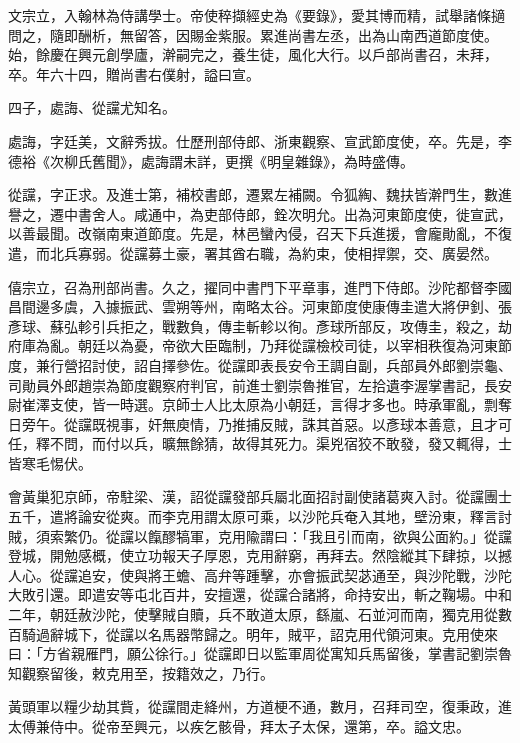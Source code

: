 \begin{pinyinscope}
 文宗立，入翰林為侍講學士。帝使稡擷經史為《要錄》，愛其博而精，試舉諸條擿問之，隨即酬析，無留答，因賜金紫服。累進尚書左丞，出為山南西道節度使。始，餘慶在興元創學廬，澣嗣完之，養生徒，風化大行。以戶部尚書召，未拜，卒。年六十四，贈尚書右僕射，謚曰宣。



 四子，處誨、從讜尤知名。



 處誨，字廷美，文辭秀拔。仕歷刑部侍郎、浙東觀察、宣武節度使，卒。先是，李德裕《次柳氏舊聞》，處誨謂未詳，更撰《明皇雜錄》，為時盛傳。



 從讜，字正求。及進士第，補校書郎，遷累左補闕。令狐綯、魏扶皆澣門生，數進譽之，遷中書舍人。咸通中，為吏部侍郎，銓次明允。出為河東節度使，徙宣武，以善最聞。改嶺南東道節度。先是，林邑蠻內侵，召天下兵進援，會龐勛亂，不復遣，而北兵寡弱。從讜募土豪，署其酋右職，為約束，使相捍禦，交、廣晏然。



 僖宗立，召為刑部尚書。久之，擢同中書門下平章事，進門下侍郎。沙陀都督李國昌間邊多虞，入據振武、雲朔等州，南略太谷。河東節度使康傳圭遣大將伊釗、張彥球、蘇弘軫引兵拒之，戰數負，傳圭斬軫以徇。彥球所部反，攻傳圭，殺之，劫府庫為亂。朝廷以為憂，帝欲大臣臨制，乃拜從讜檢校司徒，以宰相秩復為河東節度，兼行營招討使，詔自擇參佐。從讜即表長安令王調自副，兵部員外郎劉崇龜、司勛員外郎趙崇為節度觀察府判官，前進士劉崇魯推官，左拾遺李渥掌書記，長安尉崔澤支使，皆一時選。京師士人比太原為小朝廷，言得才多也。時承軍亂，剽奪日旁午。從讜既視事，奸無庾情，乃推捕反賊，誅其首惡。以彥球本善意，且才可任，釋不問，而付以兵，曠無餘猜，故得其死力。渠兇宿狡不敢發，發又輒得，士皆寒毛惕伏。



 會黃巢犯京師，帝駐梁、漢，詔從讜發部兵屬北面招討副使諸葛爽入討。從讜團士五千，遣將論安從爽。而李克用謂太原可乘，以沙陀兵奄入其地，壁汾東，釋言討賊，須索繁仍。從讜以餼醪犒軍，克用隃謂曰：「我且引而南，欲與公面約。」從讜登城，開勉感概，使立功報天子厚恩，克用辭窮，再拜去。然陰縱其下肆掠，以撼人心。從讜追安，使與將王蟾、高弁等踵擊，亦會振武契苾通至，與沙陀戰，沙陀大敗引還。即遣安等屯北百井，安擅還，從讜合諸將，命持安出，斬之鞠場。中和二年，朝廷赦沙陀，使擊賊自贖，兵不敢道太原，繇嵐、石並河而南，獨克用從數百騎過辭城下，從讜以名馬器幣歸之。明年，賊平，詔克用代領河東。克用使來曰：「方省親雁門，願公徐行。」從讜即日以監軍周從寓知兵馬留後，掌書記劉崇魯知觀察留後，敕克用至，按籍效之，乃行。



 黃頭軍以糧少劫其貲，從讜間走絳州，方道梗不通，數月，召拜司空，復秉政，進太傅兼侍中。從帝至興元，以疾乞骸骨，拜太子太保，還第，卒。謚文忠。




\end{pinyinscope}
